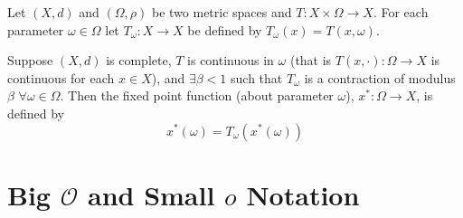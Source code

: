 \documentclass[11pt]{elegantbook}
\begin{document}
\begin{theorem}
    Let $(X, d)$ and $(\Omega, \rho)$ be two metric spaces and $T : X \times \Omega \rightarrow X$. For each parameter $\omega \in \Omega$ let $T_\omega : X \rightarrow X$ be defined by $T_\omega(x)=T(x,\omega)$.

    Suppose $(X, d)$ is complete, $T$ is continuous in $\omega$ (that is $T(x, \cdot) : \Omega \rightarrow X$ is continuous for each $x \in X$), and $\exists \beta < 1$ such that $T_\omega$ is a contraction of modulus $\beta$ $\forall \omega \in \Omega$. Then the fixed point function (about parameter $\omega$), $x^*: \Omega \rightarrow X$, is defined by $$x^*(\omega)=T_\omega(x^*(\omega))$$

\end{theorem}






\chapter{Big $\mathcal{O}$ and Small $o$ Notation}
\end{document}
